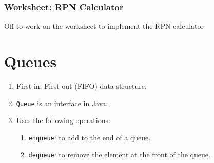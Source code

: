 \documentclass{beamer}
\begin{document}
\begin{frame}
    \frametitle{Worksheet: RPN Calculator}
    \centering
    \vfill
    Off to work on the worksheet to implement the RPN calculator
    \vfill
\end{frame}

\section{Queues}
\begin{frame}
    \begin{enumerate}
        \item First in, First out (FIFO) data structure.
        \item \lstinline|Queue| is an interface in Java.
        \item Uses the following operations:
        \begin{enumerate}
            \item \lstinline|enqueue|: to add to the end of a queue.
            \item \lstinline|dequeue|: to remove the element at the front of the queue.
        \end{enumerate}
    \end{enumerate}
\end{frame}
\end{document}
